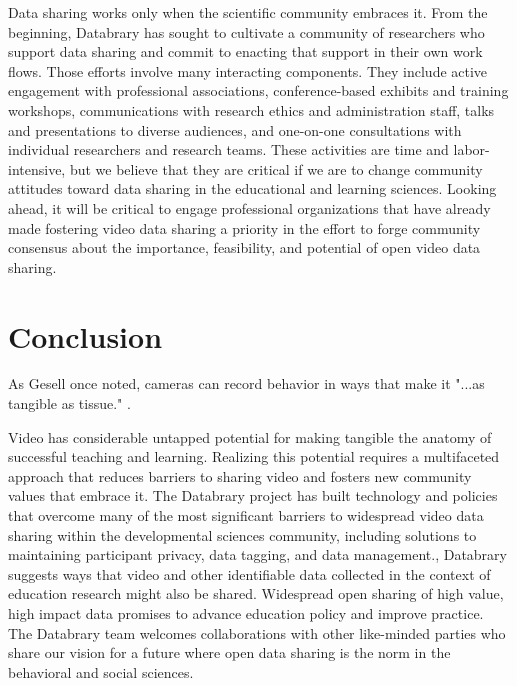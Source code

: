 \documentclass[letterpaper,man,apacite]{apa6}
\begin{document}
Data sharing works only when the scientific community embraces it.
From the beginning, Databrary has sought to cultivate a community of researchers who support data sharing and commit to enacting that support in their own work flows.
Those efforts involve many interacting components.
They include active engagement with professional associations, conference-based exhibits and training workshops, communications with research ethics and administration staff, talks and presentations to diverse audiences, and one-on-one consultations with individual researchers and research teams.
These activities are time and labor-intensive, but we believe that they are critical if we are to change community attitudes toward data sharing in the educational and learning sciences.
Looking ahead, it will be critical to engage professional organizations that have already made fostering video data sharing a priority in the effort to forge community consensus about the importance, feasibility, and potential of open video data sharing.

\section{Conclusion}

As Gesell once noted, cameras can record behavior in ways that make it "...as tangible as tissue." \cite{Scott2011}.

Video has considerable untapped potential for making tangible the anatomy of successful teaching and learning.
Realizing this potential requires a multifaceted approach that reduces barriers to sharing video and fosters new community values that embrace it.
The Databrary project has built technology and policies that overcome many of the most significant barriers to widespread video data sharing within the developmental sciences community, including solutions to maintaining participant privacy, data tagging, and data management., 
Databrary suggests ways that video and other identifiable data collected in the context of education research might also be shared.
Widespread open sharing of high value, high impact data promises to advance education policy and improve practice.
The Databrary team welcomes collaborations with other like-minded parties who share our vision \cite{Adolph2012} for a future where open data sharing is the norm in the behavioral and social sciences.


\end{document}
